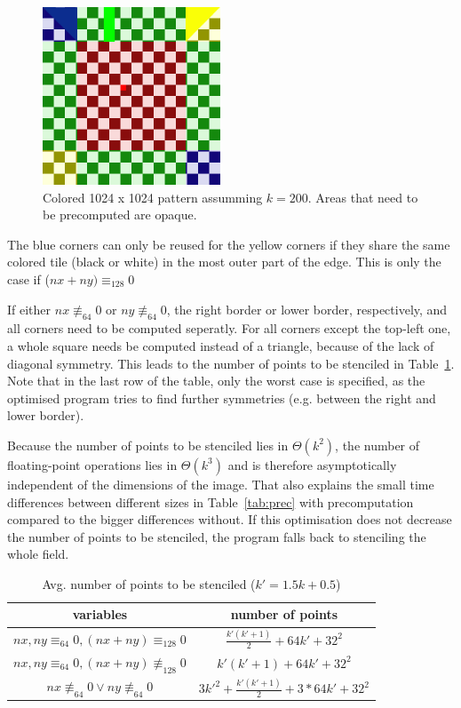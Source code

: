 \documentclass[letterpaper,twocolumn,10pt]{article}
\begin{document}
\begin{figure}[t]
	\begin{center}
	\includegraphics[width=150pt]{res/stencil_colored_with_prec}
	\caption{Colored 1024 x 1024 pattern assumming $k = 200$. Areas that need to be precomputed are opaque.}
	\label{fig:board}
	\end{center}
	\vspace{-0.3in}
\end{figure}

The blue corners can only be reused for the yellow corners
if they share the same colored tile (black or white) in the most outer part of the edge. This is only the
case if ($nx + ny) \equiv_{128} 0$

If either $nx \not\equiv_{64} 0$ or $ny \not\equiv_{64}0$, the right border or lower border,
respectively, and all corners need to be computed seperatly.
For all corners except the top-left one,
a whole square needs be computed instead of a triangle, because of the lack of diagonal symmetry.  
This leads to the number of points to be stenciled in Table~\ref{tab:numstencil}. Note that
in the last row of the table, only the worst case is specified, as the optimised program
tries to find further symmetries (e.g. between the right and lower border).

Because the number of points to be stenciled lies in $\Theta(k^2)$, the number of floating-point
operations lies in $\Theta(k^3)$ and is therefore asymptotically independent of the dimensions of the image. That also explains the small time differences between different sizes in Table~\ref{tab:prec} with precomputation compared to the bigger differences without.
If this optimisation does not decrease the number of points to be stenciled, the program falls back to stenciling the whole field.

\begin{table}[ht]
	\caption{Avg. number of points to be stenciled ($k' = 1.5k+0.5$)}
	\begin{tabular}{c c}
		variables & number of points\\
		\hline
		$\scriptstyle nx,ny \equiv_{64}0,(nx+ny) \equiv_{128}0$ & $ \frac{k'(k'+ 1)}{2} + 64k' + 32^{2}$\\
		$\scriptstyle nx,ny \equiv_{64}0,(nx+ny) \not\equiv_{128}0$ & $ k'(k'+1) + 64k' + 32^{2}$\\
		$\scriptstyle nx \not\equiv_{64}0 \lor \scriptstyle ny \not\equiv_{64}0$ & $ 3k'^{2} + \frac{k'(k'+1)}{2} + 3 * 64k' + 32^{2}$\\
	\end{tabular}
	\label{tab:numstencil}
\end{table}
\end{document}
